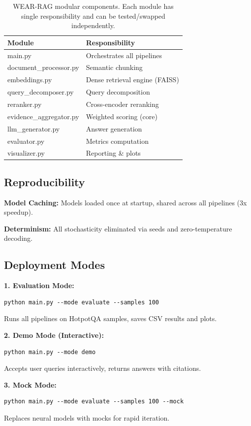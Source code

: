\documentclass[twocolumn,11pt]{article}
\begin{document}
\begin{table}[H]
\centering
\small
\begin{tabular}{|l|l|}
\hline
\textbf{Module} & \textbf{Responsibility} \\
\hline
main.py & Orchestrates all pipelines \\
document\_processor.py & Semantic chunking \\
embeddings.py & Dense retrieval engine (FAISS) \\
query\_decomposer.py & Query decomposition \\
reranker.py & Cross-encoder reranking \\
evidence\_aggregator.py & Weighted scoring (core) \\
llm\_generator.py & Answer generation \\
evaluator.py & Metrics computation \\
visualizer.py & Reporting \& plots \\
\hline
\end{tabular}
\caption{WEAR-RAG modular components. Each module has single responsibility and can be tested/swapped independently.}
\label{tab:modules}
\end{table}

\subsection{Reproducibility}

\textbf{Model Caching:} Models loaded once at startup, shared across all pipelines (3x speedup).

\textbf{Determinism:} All stochasticity eliminated via seeds and zero-temperature decoding.

\subsection{Deployment Modes}

\textbf{1. Evaluation Mode:}
\begin{verbatim}
python main.py --mode evaluate --samples 100
\end{verbatim}
Runs all pipelines on HotpotQA samples, saves CSV results and plots.

\textbf{2. Demo Mode (Interactive):}
\begin{verbatim}
python main.py --mode demo
\end{verbatim}
Accepts user queries interactively, returns answers with citations.

\textbf{3. Mock Mode:}
\begin{verbatim}
python main.py --mode evaluate --samples 100 --mock
\end{verbatim}
Replaces neural models with mocks for rapid iteration.
\end{document}
